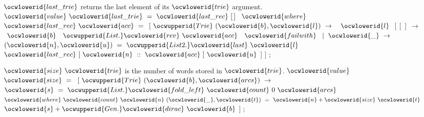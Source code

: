 \documentclass[12pt]{article}
\begin{document}
\ocwendcode{}\ocwindent{0.00em}
\ocwbegindcode{}$\ocwlowerid{last\_trie}$\ocwenddcode{} returns the last element of its \ocwbegindcode{}$\ocwlowerid{trie}$\ocwenddcode{} argument. 
\ocweol
\label{../ML/trie.ml:5315}%
\medskip
\ocwbegincode{}\ocwindent{0.00em}
$\ocwlowerid{value}~\ocwlowerid{last\_trie}~=~\ocwlowerid{last\_rec}~[\,]~$\ocweol
\ocwindent{1.50em}
$\ocwlowerid{where}~$~$\ocwlowerid{last\_rec}~\ocwlowerid{acc}~=~$\ocweol
\ocwindent{2.50em}
$[~\ocwupperid{Trie}~(\ocwlowerid{b},\ocwlowerid{l})~\rightarrow{}~$~$\ocwlowerid{l}~$\ocweol
\ocwindent{3.50em}
$[~[\,]~\rightarrow{}~$~$\ocwlowerid{b}~$~$\ocwupperid{List.}\ocwlowerid{rev}~\ocwlowerid{acc}~$~$\ocwlowerid{failwith}~$\ocweol
\ocwindent{3.50em}
$\mid{}~\ocwlowerid{\_}~\rightarrow{}~$~$(\ocwlowerid{n},\ocwlowerid{u})~=~\ocwupperid{List2.}\ocwlowerid{last}~\ocwlowerid{l}~$\ocweol
\ocwindent{7.00em}
$\ocwlowerid{last\_rec}~[~\ocwlowerid{n}~::~\ocwlowerid{acc}~]~\ocwlowerid{u}$\ocweol
\ocwindent{3.50em}
$]$\ocweol
\ocwindent{2.50em}
$]$\ocweol
\ocwindent{0.00em}
;\medskip

\ocwendcode{}\ocwindent{0.00em}
\ocwbegindcode{}$\ocwlowerid{size}~\ocwlowerid{trie}$\ocwenddcode{} is the number of words stored in \ocwbegindcode{}$\ocwlowerid{trie}$\ocwenddcode{}. 
\ocweol
\label{../ML/trie.ml:5634}%
\medskip
\ocwbegincode{}\ocwindent{0.00em}
$\ocwlowerid{value}~$~$\ocwlowerid{size}~=~$\ocweol
\ocwindent{1.00em}
$[~\ocwupperid{Trie}~(\ocwlowerid{b},\ocwlowerid{arcs})~\rightarrow{}~$\ocweol
\ocwindent{2.50em}
~$\ocwlowerid{s}~=~\ocwupperid{List.}\ocwlowerid{fold\_left}~\ocwlowerid{count}~0~\ocwlowerid{arcs}$\ocweol
\ocwindent{6.50em}
$\ocwlowerid{where}~\ocwlowerid{count}~\ocwlowerid{n}~(\ocwlowerid{\_},\ocwlowerid{t})~=~\ocwlowerid{n}+\ocwlowerid{size}~\ocwlowerid{t}~$\ocweol
\ocwindent{2.50em}
$\ocwlowerid{s}+\ocwupperid{Gen.}\ocwlowerid{dirac}~\ocwlowerid{b}$\ocweol
\ocwindent{1.00em}
$]$\ocweol
\ocwindent{0.00em}
;\medskip
\end{document}
